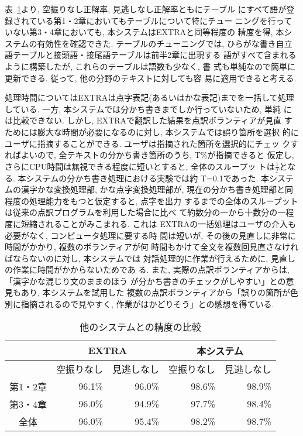 表~\ref{table:d}より, 空振りなし正解率, 見逃しなし正解率ともにテーブル
にすべて語が登録されている第1・2章においてもテーブルについて特にチュー
ニングを行っていない第3・4章においても, 本システムはEXTRAと同等程度の
精度を得, 本システムの有効性を確認できた. テーブルのチューニングでは, 
ひらがな書き自立語テーブルと接頭語・接尾語テーブルは前半2章に出現する
語がすべて含まれるように構築したが, これらのテーブルは語数も少なく, 書
式も単純なので簡単に更新できる. 従って, 他の分野のテキストに対しても容
易に適用できると考える. 

処理時間についてはEXTRAは点字表記(あるいはかな表記)までを一括して処理
している. 一方, 本システムでは分かち書きまでしか行っていないため, 単純
には比較できない. しかし, EXTRAで翻訳した結果を点訳ボランティアが見直
すためには膨大な時間が必要になるのに対し, 本システムでは誤り箇所を選択
的にユーザに指摘することができる. ユーザは指摘された箇所を選択的にチェッ
クすればよいので, 全テキストの分かち書き箇所のうち, T\%が指摘できると
仮定し, さらにCPU時間は無視できる程度に短いとすると, 全体のスループッ
トは$\frac{1}{T}$となる. 本システムの分かち書き処理における実験では約
T=0.1であった. 本システムの漢字かな変換処理部, かな点字変換処理部が, 
現在の分かち書き処理部と同程度の処理能力をもつと仮定すると, 点字を出力
するまでの全体のスループットは従来の点訳プログラムを利用した場合に比べ
て約数分の一から十数分の一程度に短縮されることがみこまれる. これは
EXTRAの一括処理はユーザの介入も必要がなく, コンピュータ処理に要する時
間は短いが, その後の見直しに非常に時間がかかり, 複数のボランティアが何
時間もかけて全文を複数回見直さなければならないのに対し, 本システムでは
対話処理的に作業が行えるために, 見直しの作業に時間がかからないためであ
る. また, 実際の点訳ボランティアからは, 「漢字かな混じり文のままのほう
が分かち書きのチェックがしやすい」との意見もあり, 本システムを試用した
複数の点訳ボランティアから「誤りの箇所が色別に指摘されるので見やすく, 
作業がはかどりそう」との感想を得ている. 

{
\begin{table}[htb]
\caption{他のシステムとの精度の比較}
\label{table:d}
\begin{center}
\begin{tabular}{|c||r|r|r|r|}\hline
 &\multicolumn{2}{|c|}{EXTRA} 
 &\multicolumn{2}{|c|}{本システム} \\ \hline
 & 空振りなし & 見逃しなし & 空振りなし & 見逃しなし \\ \hline \hline
第1・2章 &96.1\% & 96.0\%
	&98.6\% & 98.9\%\\\hline
第3・4章 &96.0\% & 94.9\%
	&97.7\% & 98.4\%\\\hline
全体 & 96.0\%& 95.4\% & 98.2\% & 98.7\% \\\hline
 \end{tabular}
\end{center}
\end{table}
}


